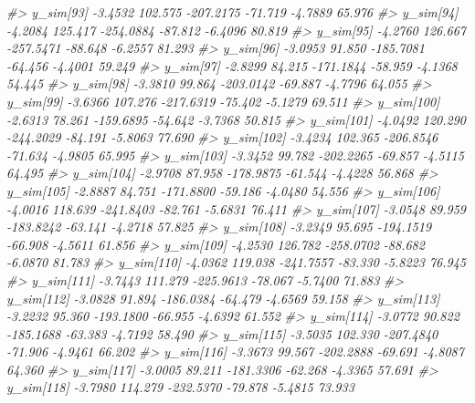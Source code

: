\documentclass[
  10pt,
  italian,
  a4paper,
  extrafontsizes,onecolumn,openright
  ]{memoir}
\newenvironment{Shaded}{\begin{snugshade}}{\end{snugshade}}
\newcommand{\CommentTok}[1]{\textcolor[rgb]{0.56,0.35,0.01}{\textit{#1}}}
\begin{document}
\begin{Shaded}
\begin{Highlighting}[]
\CommentTok{\#\textgreater{}   y\_sim[93]  {-}3.4532 102.575 {-}207.2175 {-}71.719 {-}4.7889 65.976}
\CommentTok{\#\textgreater{}   y\_sim[94]  {-}4.2084 125.417 {-}254.0884 {-}87.812 {-}6.4096 80.819}
\CommentTok{\#\textgreater{}   y\_sim[95]  {-}4.2760 126.667 {-}257.5471 {-}88.648 {-}6.2557 81.293}
\CommentTok{\#\textgreater{}   y\_sim[96]  {-}3.0953  91.850 {-}185.7081 {-}64.456 {-}4.4001 59.249}
\CommentTok{\#\textgreater{}   y\_sim[97]  {-}2.8299  84.215 {-}171.1844 {-}58.959 {-}4.1368 54.445}
\CommentTok{\#\textgreater{}   y\_sim[98]  {-}3.3810  99.864 {-}203.0142 {-}69.887 {-}4.7796 64.055}
\CommentTok{\#\textgreater{}   y\_sim[99]  {-}3.6366 107.276 {-}217.6319 {-}75.402 {-}5.1279 69.511}
\CommentTok{\#\textgreater{}   y\_sim[100] {-}2.6313  78.261 {-}159.6895 {-}54.642 {-}3.7368 50.815}
\CommentTok{\#\textgreater{}   y\_sim[101] {-}4.0492 120.290 {-}244.2029 {-}84.191 {-}5.8063 77.690}
\CommentTok{\#\textgreater{}   y\_sim[102] {-}3.4234 102.365 {-}206.8546 {-}71.634 {-}4.9805 65.995}
\CommentTok{\#\textgreater{}   y\_sim[103] {-}3.3452  99.782 {-}202.2265 {-}69.857 {-}4.5115 64.495}
\CommentTok{\#\textgreater{}   y\_sim[104] {-}2.9708  87.958 {-}178.9875 {-}61.544 {-}4.4228 56.868}
\CommentTok{\#\textgreater{}   y\_sim[105] {-}2.8887  84.751 {-}171.8800 {-}59.186 {-}4.0480 54.556}
\CommentTok{\#\textgreater{}   y\_sim[106] {-}4.0016 118.639 {-}241.8403 {-}82.761 {-}5.6831 76.411}
\CommentTok{\#\textgreater{}   y\_sim[107] {-}3.0548  89.959 {-}183.8242 {-}63.141 {-}4.2718 57.825}
\CommentTok{\#\textgreater{}   y\_sim[108] {-}3.2349  95.695 {-}194.1519 {-}66.908 {-}4.5611 61.856}
\CommentTok{\#\textgreater{}   y\_sim[109] {-}4.2530 126.782 {-}258.0702 {-}88.682 {-}6.0870 81.783}
\CommentTok{\#\textgreater{}   y\_sim[110] {-}4.0362 119.038 {-}241.7557 {-}83.330 {-}5.8223 76.945}
\CommentTok{\#\textgreater{}   y\_sim[111] {-}3.7443 111.279 {-}225.9613 {-}78.067 {-}5.7400 71.883}
\CommentTok{\#\textgreater{}   y\_sim[112] {-}3.0828  91.894 {-}186.0384 {-}64.479 {-}4.6569 59.158}
\CommentTok{\#\textgreater{}   y\_sim[113] {-}3.2232  95.360 {-}193.1800 {-}66.955 {-}4.6392 61.552}
\CommentTok{\#\textgreater{}   y\_sim[114] {-}3.0772  90.822 {-}185.1688 {-}63.383 {-}4.7192 58.490}
\CommentTok{\#\textgreater{}   y\_sim[115] {-}3.5035 102.330 {-}207.4840 {-}71.906 {-}4.9461 66.202}
\CommentTok{\#\textgreater{}   y\_sim[116] {-}3.3673  99.567 {-}202.2888 {-}69.691 {-}4.8087 64.360}
\CommentTok{\#\textgreater{}   y\_sim[117] {-}3.0005  89.211 {-}181.3306 {-}62.268 {-}4.3365 57.691}
\CommentTok{\#\textgreater{}   y\_sim[118] {-}3.7980 114.279 {-}232.5370 {-}79.878 {-}5.4815 73.933}

\end{Highlighting}
\end{Shaded}
\end{document}
